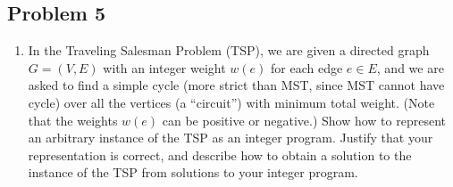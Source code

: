 \documentclass[11pt]{article}
\begin{document}
\subsection*{Problem 5}

\begin{enumerate}
    \item In the Traveling Salesman Problem (TSP), we are given a directed graph $G = (V,E)$ with an integer weight $w(e)$ for each edge $e \in E$, and we are asked to find a simple cycle (more strict than MST, since MST cannot have cycle) over all the vertices (a “circuit”) with minimum total weight. (Note that the weights $w(e)$ can be positive or negative.) Show how to represent an arbitrary instance of the TSP as an integer program. Justify that your representation is correct, and describe how to obtain a solution to the instance of the TSP from solutions to your integer program.


\end{enumerate}
\end{document}
